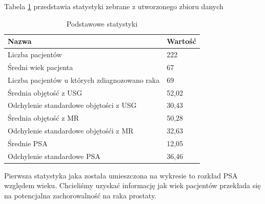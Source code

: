 \documentclass[a4paper,11pt,twoside]{report}
\theoremstyle{definition}
\begin{document}
Tabela \ref{Podstawowe statystyki} przedstawia statystyki zebrane z utworzonego zbioru danych
\begin{table}[h!]
	\caption{Podstawowe statystyki}
	\centering
	\begin{tabular}{|p{5cm}|l|} \hline  
		Nazwa & Wartość \\ \hline
		Liczba pacjentów & 222  \\ \hline 
		Średni wiek pacjenta & 67  \\ \hline 
		Liczba pacjentów u których zdiagnozowano raka & 69  \\ \hline 
		Średnia objętość z USG & 52,02  \\ \hline 
		Odchylenie standardowe objętości z USG & 30,43  \\ \hline       
		Średnia objętość z MR & 50,28  \\ \hline       
		Odchylenie standardowe objętośći z MR & 32,63  \\ \hline       
		Średnie PSA & 12,05  \\ \hline   
		Odchylenie standardowe PSA & 36,46  \\ \hline         
	\end{tabular}
	\label{Podstawowe statystyki}
\end{table}

Pierwsza statystyka jaka została umieszczona na wykresie to rozkład PSA względem wieku. Chcieliśmy uzyskać informację jak wiek pacjentów przekłada się na potencjalna zachorowalność na raka prostaty.
\end{document}
